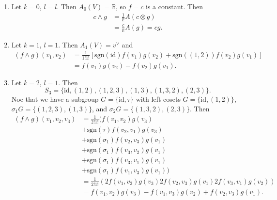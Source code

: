 \begin{xmpl}
  \begin{enumerate}
    \item{
      Let $k = 0$, $l = l$. Then $A_0(V) = \mathbb{R}$, so $f = c$ is a
      constant. Then
      \begin{align*}
         c \wedge g
      &= \frac{1}{l!}
         A(c \otimes g) \\
      &= \frac{c}{l!}
           A(g)
       = c g.
      \end{align*}
    }
    \item{
      Let $k = 1$, $l = 1$. Then
      $A_1(V) = v^\vee$ and
      \begin{align*}
         (f \wedge g)(v_1, v_2)
      &= \frac{1}{1! 1!}
           \left[
             \mathrm{sgn}(\mathrm{id})
             f(v_1)g(v_2)
           + \mathrm{sgn}((1,2))
             f(v_2)g(v_1)
           \right] \\
      &= f(v_1)g(v_2) - f(v_2)g(v_1).
      \end{align*}
    }
    \item{
      Let $k = 2$, $l = 1$. Then
      $$
        S_3
      = \{ \mathrm{id}
         , (1, 2)
         , (1, 2, 3)
         , (1, 3)
         , (1, 3, 2)
         , (2, 3)
        \}.
      $$
      Noe that we have a subgroup $G = \{\mathrm{id}, \tau\}$ with
      left-cosets $G = \{\mathrm{id}, (1,2)\}$,
      $\sigma_1 G = \{ (1, 2, 3), (1, 3) \}$, and
      $\sigma_2 G = \{ (1, 3, 2), (2, 3) \}$. Then
      \begin{align*}
         (f \wedge g)(v_1, v_2, v_3)
      &= \frac{1}{2! 1!}
        (f(v_1, v_2) g(v_3) \\
      &+ \mathrm{sgn}(\tau)
         f(v_2, v_1)
         g(v_3) \\
      &+ \mathrm{sgn}(\sigma_1)
         f(v_2, v_3)
         g(v_1) \\
      &+ \mathrm{sgn}(\sigma_1)
         f(v_3, v_2)
         g(v_1) \\
      &+ \mathrm{sgn}(\sigma_1)
         f(v_3, v_1)
         g(v_1) \\
      &+ \mathrm{sgn}(\sigma_1)
         f(v_1, v_3)
         g(v_1)) \\
      &= \frac{1}{2! 1!}(
         2 f(v_1, v_2) g(v_3)
         2 f(v_2, v_3) g(v_1)
         2 f(v_3, v_1) g(v_2)) \\
      &= f(v_1, v_2) g(v_3)
       - f(v_1, v_3) g(v_2)
       + f(v_2, v_3) g(v_1).
      \end{align*}

}
\end{enumerate}
\end{xmpl}
